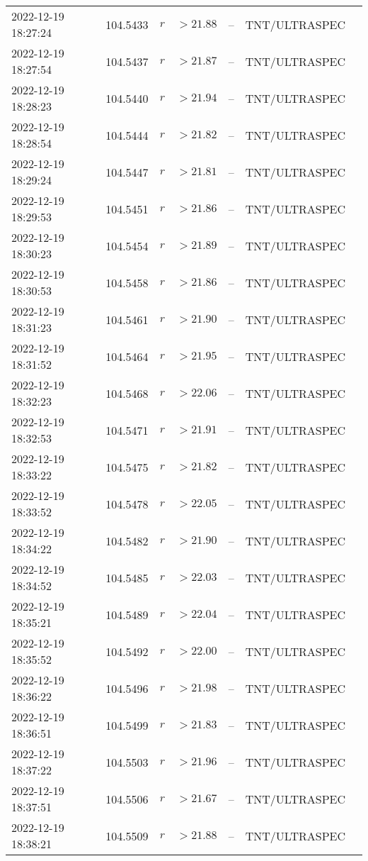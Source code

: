 \documentclass{nature_plusfigure}
\begin{document}
\begin{supplement}
\begin{center}
\begin{longtable}{lllllll}
2022-12-19 18:27:24 & 104.5433 & $r$ & $>21.88$ & -- & TNT/ULTRASPEC &  \\ 
2022-12-19 18:27:54 & 104.5437 & $r$ & $>21.87$ & -- & TNT/ULTRASPEC &  \\ 
2022-12-19 18:28:23 & 104.5440 & $r$ & $>21.94$ & -- & TNT/ULTRASPEC &  \\ 
2022-12-19 18:28:54 & 104.5444 & $r$ & $>21.82$ & -- & TNT/ULTRASPEC &  \\ 
2022-12-19 18:29:24 & 104.5447 & $r$ & $>21.81$ & -- & TNT/ULTRASPEC &  \\ 
2022-12-19 18:29:53 & 104.5451 & $r$ & $>21.86$ & -- & TNT/ULTRASPEC &  \\ 
2022-12-19 18:30:23 & 104.5454 & $r$ & $>21.89$ & -- & TNT/ULTRASPEC &  \\ 
2022-12-19 18:30:53 & 104.5458 & $r$ & $>21.86$ & -- & TNT/ULTRASPEC &  \\ 
2022-12-19 18:31:23 & 104.5461 & $r$ & $>21.90$ & -- & TNT/ULTRASPEC &  \\ 
2022-12-19 18:31:52 & 104.5464 & $r$ & $>21.95$ & -- & TNT/ULTRASPEC &  \\ 
2022-12-19 18:32:23 & 104.5468 & $r$ & $>22.06$ & -- & TNT/ULTRASPEC &  \\ 
2022-12-19 18:32:53 & 104.5471 & $r$ & $>21.91$ & -- & TNT/ULTRASPEC &  \\ 
2022-12-19 18:33:22 & 104.5475 & $r$ & $>21.82$ & -- & TNT/ULTRASPEC &  \\ 
2022-12-19 18:33:52 & 104.5478 & $r$ & $>22.05$ & -- & TNT/ULTRASPEC &  \\ 
2022-12-19 18:34:22 & 104.5482 & $r$ & $>21.90$ & -- & TNT/ULTRASPEC &  \\ 
2022-12-19 18:34:52 & 104.5485 & $r$ & $>22.03$ & -- & TNT/ULTRASPEC &  \\ 
2022-12-19 18:35:21 & 104.5489 & $r$ & $>22.04$ & -- & TNT/ULTRASPEC &  \\ 
2022-12-19 18:35:52 & 104.5492 & $r$ & $>22.00$ & -- & TNT/ULTRASPEC &  \\ 
2022-12-19 18:36:22 & 104.5496 & $r$ & $>21.98$ & -- & TNT/ULTRASPEC &  \\ 
2022-12-19 18:36:51 & 104.5499 & $r$ & $>21.83$ & -- & TNT/ULTRASPEC &  \\ 
2022-12-19 18:37:22 & 104.5503 & $r$ & $>21.96$ & -- & TNT/ULTRASPEC &  \\ 
2022-12-19 18:37:51 & 104.5506 & $r$ & $>21.67$ & -- & TNT/ULTRASPEC &  \\ 
2022-12-19 18:38:21 & 104.5509 & $r$ & $>21.88$ & -- & TNT/ULTRASPEC &  \\ 

\end{longtable}
\end{center}
\end{supplement}
\end{document}
